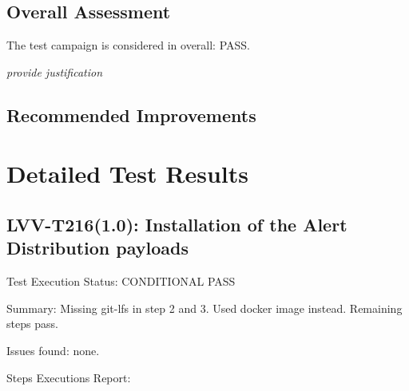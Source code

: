 \documentclass[DM,lsstdraft,STR,toc]{lsstdoc}
\begin{document}
\subsection{Overall Assessment}
\label{sect:overallassessment}

The test campaign is considered in overall: PASS.

\textit{provide justification}


\subsection{Recommended Improvements}
\label{sect:recommendations}




\newpage

\section{Detailed Test Results}
\label{sect:detailed}


\subsection{LVV-T216(1.0): Installation of the Alert Distribution payloads}
\label{sect:detail-lvv-t216}

Test Execution Status: CONDITIONAL PASS

Summary: Missing git-lfs in step 2 and 3. Used docker image instead. Remaining steps pass.

Issues found: none.

Steps Executions Report:
\end{document}
